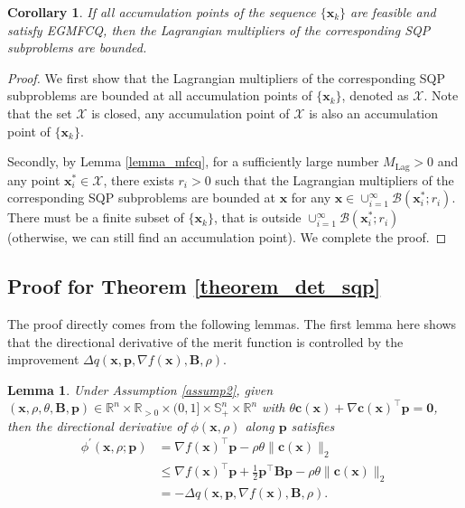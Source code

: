 \documentclass[aos]{imsart}
\numberwithin{equation}{section}
\theoremstyle{plain}
\newtheorem{lemma}{Lemma}
\newtheorem{corollary}{Corollary}
\begin{document}
\begin{appendix}
\begin{corollary}
    If all accumulation points of the sequence $\{\bm{x}_k\}$ are feasible and satisfy EGMFCQ, then the Lagrangian multipliers of the corresponding SQP subproblems are bounded. 
\end{corollary}


\begin{proof}
    We first show that the Lagrangian multipliers of the corresponding SQP subproblems are bounded at all accumulation points of $\{\bm{x}_k\}$, denoted as $\mathcal{X}$. Note that the set $\mathcal{X}$ is closed, any accumulation point of $\mathcal{X}$ is also an accumulation point of $\{\bm{x}_k\}$. 

    Secondly, by Lemma \ref{lemma_mfcq}, for a sufficiently large number $M_{\text{Lag}}>0$ and any point $\bm{x}^{*}_{i} \in \mathcal{X}$, there exists $r_{i}>0$ such that the Lagrangian multipliers of the corresponding SQP subproblems are bounded at $\bm{x}$ for any $\bm{x} \in \cup_{i=1}^{\infty}\mathcal{B}(\bm{x}_{i}^{*};r_i)$. There must be a finite subset of $\{\bm{x}_k\}$, that is outside $\cup_{i=1}^{\infty}\mathcal{B}(\bm{x}_{i}^{*};r_i)$ (otherwise, we can still find an accumulation point). We complete the proof. 
\end{proof}


\subsection{Proof for Theorem \ref{theorem_det_sqp}} 
\label{sec:appendix1.3}
The proof directly comes from the following lemmas. The first lemma here shows that the directional derivative of the merit function is controlled by the improvement $\Delta q(\bm{x},\bm{p},\nabla f(\bm{x}),\bm{B},\rho)$.

\begin{lemma}
 \label{lemma1}
 Under Assumption \ref{assump2}, given $(\bm{x},\rho,\theta,\bm{B},\bm{p}) \in \mathbb{R}^{n} \times \mathbb{R}_{>0} \times (0,1] \times \mathbb{S}_{+}^{n} \times \mathbb{R}^{n}$ with $\theta \bm{c}(\bm{x}) + \nabla \bm{c}(\bm{x})^{\top} \bm{p} = \bm{0}$, then the directional derivative of $\phi(\bm{x},\rho)$ along $\bm{p}$ satisfies
 \begin{equation}
\begin{split}
        \phi^{\prime}(\bm{x},\rho;\bm{p}) & = \nabla f(\bm{x})^{\top} \bm{p} - \rho \theta \|\bm{c}(\bm{x})\|_2 \\
        & \leq \nabla f(\bm{x})^{\top} \bm{p} + \frac{1}{2} \bm{p}^{\top}\bm{B}\bm{p} - \rho \theta \|\bm{c}(\bm{x})\|_2\\
        & = -\Delta q(\bm{x},\bm{p},\nabla f(\bm{x}),\bm{B},\rho).
\end{split}
 \end{equation}
 \end{lemma}


\end{appendix}
\end{document}
